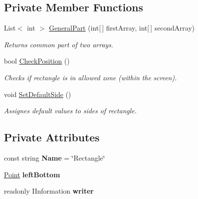 \subsection*{Private Member Functions}
\begin{DoxyCompactItemize}
\item 
List$<$ int $>$ \mbox{\hyperlink{class_home_work_1_1_task_library_1_1_tasks_1_1_lesson6_1_1_task2_1_1_classes_1_1_rectangle_a7335ed33b92312a08648a6bfe29b613d}{General\+Part}} (int\mbox{[}$\,$\mbox{]} first\+Array, int\mbox{[}$\,$\mbox{]} second\+Array)
\begin{DoxyCompactList}\small\item\em Returns common part of two arrays. \end{DoxyCompactList}\item 
bool \mbox{\hyperlink{class_home_work_1_1_task_library_1_1_tasks_1_1_lesson6_1_1_task2_1_1_classes_1_1_rectangle_a391e3caf3d6522918ee4cb483eec15f4}{Check\+Position}} ()
\begin{DoxyCompactList}\small\item\em Checks if rectangle is in allowed zone (within the screen). \end{DoxyCompactList}\item 
void \mbox{\hyperlink{class_home_work_1_1_task_library_1_1_tasks_1_1_lesson6_1_1_task2_1_1_classes_1_1_rectangle_a1a9bd6446fcc822b4c000beb394d8eb6}{Set\+Default\+Side}} ()
\begin{DoxyCompactList}\small\item\em Assignes default values to sides of rectangle. \end{DoxyCompactList}\end{DoxyCompactItemize}
\subsection*{Private Attributes}
\begin{DoxyCompactItemize}
\item 
\mbox{\label{class_home_work_1_1_task_library_1_1_tasks_1_1_lesson6_1_1_task2_1_1_classes_1_1_rectangle_ae2a776b64d1a0fd3e792bd657b855202}} 
const string {\bfseries Name} = \char`\"{}Rectangle\char`\"{}
\item 
\mbox{\label{class_home_work_1_1_task_library_1_1_tasks_1_1_lesson6_1_1_task2_1_1_classes_1_1_rectangle_a012b84ef7a6afd0b03dd4f8ca6aafeba}} 
\mbox{\hyperlink{struct_home_work_1_1_task_library_1_1_tasks_1_1_lesson6_1_1_task2_1_1_classes_1_1_point}{Point}} {\bfseries left\+Bottom}
\item 
\mbox{\label{class_home_work_1_1_task_library_1_1_tasks_1_1_lesson6_1_1_task2_1_1_classes_1_1_rectangle_a14857f76bae4a14ecd239e20165a3a07}} 
readonly I\+Information {\bfseries writer}
\end{DoxyCompactItemize}


